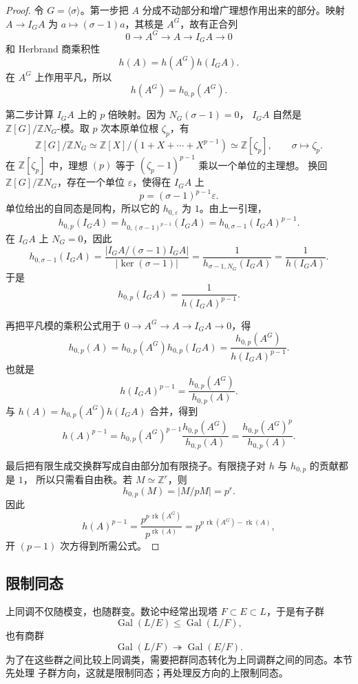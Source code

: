 \documentclass[11pt,a4paper,openany]{ctexbook}
\numberwithin{equation}{chapter}
\newcommand{\Z}{\mathbb{Z}}
\theoremstyle{plain}
\theoremstyle{definition}
\theoremstyle{remark}
\begin{document}
\begin{proof}
令 $G=\langle\sigma\rangle$。第一步把 $A$ 分成不动部分和增广理想作用出来的部分。映射
$A\to I_GA$ 为 $a\mapsto(\sigma-1)a$，其核是 $A^G$，故有正合列
\[
 0\to A^G\to A\to I_GA\to0
\]
和 Herbrand 商乘积性
\[
h(A)=h(A^G)h(I_GA).
\]
在 $A^G$ 上作用平凡，所以
\[
h(A^G)=h_{0,p}(A^G).
\]

第二步计算 $I_GA$ 上的 $p$ 倍映射。因为 $N_G(\sigma-1)=0$，
$I_GA$ 自然是 $\Z[G]/\Z N_G$-模。取 $p$ 次本原单位根 $\zeta_p$，有
\[
 \Z[G]/\Z N_G\simeq
 \Z[X]/(1+X+\cdots+X^{p-1})\simeq \Z[\zeta_p],
\qquad \sigma\mapsto \zeta_p.
\]
在 $\Z[\zeta_p]$ 中，理想 $(p)$ 等于 $(\zeta_p-1)^{p-1}$ 乘以一个单位的主理想。
换回 $\Z[G]/\Z N_G$，存在一个单位 $\varepsilon$，使得在 $I_GA$ 上
\[
p=(\sigma-1)^{p-1}\varepsilon.
\]
单位给出的自同态是同构，所以它的 $h_{0,\varepsilon}$ 为 $1$。由上一引理，
\[
h_{0,p}(I_GA)
=h_{0,(\sigma-1)^{p-1}}(I_GA)
=h_{0,\sigma-1}(I_GA)^{p-1}.
\]
在 $I_GA$ 上 $N_G=0$，因此
\[
h_{0,\sigma-1}(I_GA)
=\frac{|I_GA/(\sigma-1)I_GA|}{|\ker(\sigma-1)|}
=\frac{1}{h_{\sigma-1,N_G}(I_GA)}
=\frac{1}{h(I_GA)}.
\]
于是
\[
h_{0,p}(I_GA)=\frac{1}{h(I_GA)^{p-1}}.
\]

再把平凡模的乘积公式用于
$0\to A^G\to A\to I_GA\to0$，得
\[
h_{0,p}(A)=h_{0,p}(A^G)h_{0,p}(I_GA)
=\frac{h_{0,p}(A^G)}{h(I_GA)^{p-1}}.
\]
也就是
\[
h(I_GA)^{p-1}=\frac{h_{0,p}(A^G)}{h_{0,p}(A)}.
\]
与 $h(A)=h_{0,p}(A^G)h(I_GA)$ 合并，得到
\[
h(A)^{p-1}
=h_{0,p}(A^G)^{p-1}
\frac{h_{0,p}(A^G)}{h_{0,p}(A)}
=\frac{h_{0,p}(A^G)^p}{h_{0,p}(A)}.
\]

最后把有限生成交换群写成自由部分加有限挠子。有限挠子对 $h$ 与 $h_{0,p}$ 的贡献都是 $1$，
所以只需看自由秩。若 $M\simeq\Z^r$，则
\[
h_{0,p}(M)=|M/pM|=p^r.
\]
因此
\[
h(A)^{p-1}
=\frac{p^{p\,\operatorname{rk}(A^G)}}{p^{\operatorname{rk}(A)}}
=p^{p\,\operatorname{rk}(A^G)-\operatorname{rk}(A)},
\]
开 $(p-1)$ 次方得到所需公式。
\end{proof}

\subsection{限制同态}

上同调不仅随模变，也随群变。数论中经常出现塔
$F\subset E\subset L$，于是有子群
\[
\operatorname{Gal}(L/E)\le \operatorname{Gal}(L/F),
\]
也有商群
\[
\operatorname{Gal}(L/F)\twoheadrightarrow \operatorname{Gal}(E/F).
\]
为了在这些群之间比较上同调类，需要把群同态转化为上同调群之间的同态。本节先处理
子群方向，这就是限制同态；再处理反方向的上限制同态。
\end{document}
